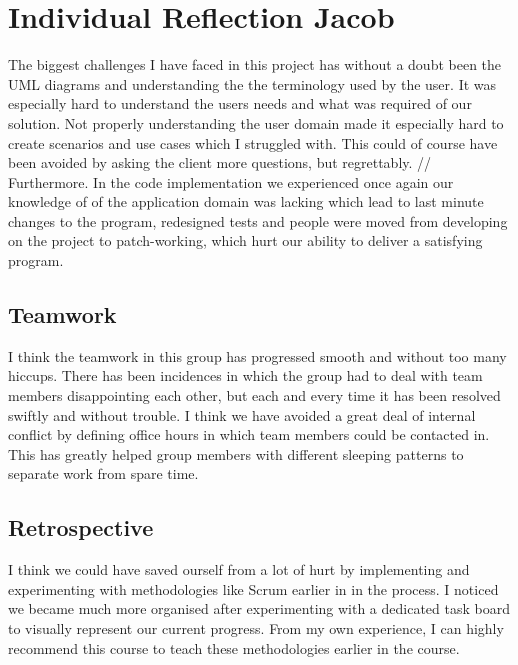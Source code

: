 \section{Individual Reflection Jacob}
The biggest challenges I have faced in this project has without a doubt been the UML diagrams and understanding the the terminology used by the user. It was especially hard to understand the users needs and what was required of our solution. Not properly understanding the user domain made it especially hard to create scenarios and use cases which I struggled with. This could of course have been avoided by asking the client more questions, but regrettably. //
Furthermore. In the code implementation we experienced once again our knowledge of of the application domain was lacking which lead to last minute changes to the program, redesigned  tests and people were moved from developing on the project to patch-working, which hurt our ability to deliver a satisfying program.
\subsection{Teamwork}
I think the teamwork in this group has progressed smooth and without too many hiccups. There has been incidences in which the group had to deal with team members disappointing each other, but each and every time it has been resolved swiftly and without trouble. I think we have avoided a great deal of internal conflict by defining office hours in which team members could be contacted in. This has greatly helped group members with different sleeping patterns to separate work from spare time.
\subsection{Retrospective}
I think we could have saved ourself from a lot of hurt by implementing and experimenting with methodologies like Scrum earlier in in the process. I noticed we became much more organised after experimenting with a dedicated task board to visually represent our current progress. From my own experience, I can highly recommend this course to teach these methodologies earlier in the course.